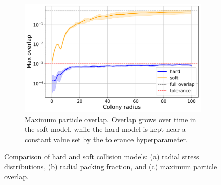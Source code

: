 \documentclass[conference]{IEEEtran}
\begin{document}
\begin{figure}[H]
    \vspace{0.5em}

    \begin{subfigure}[b]{\linewidth}
        \centering
        \includegraphics[width=\linewidth]{figures/comparison_plots/combined_colony_radius_vs_max_overlap_with_lines.png}
        \caption{Maximum particle overlap. Overlap grows over time in the soft model, while the hard model is kept near a constant value set by the tolerance hyperparameter.}
        \label{fig:max_overlap_simulation}
    \end{subfigure}

    \caption{Comparison of hard and soft collision models: (a) radial stress distributions, (b) radial packing fraction, and (c) maximum particle overlap.}
    \label{fig:comparison_all}
\end{figure}
\end{document}
